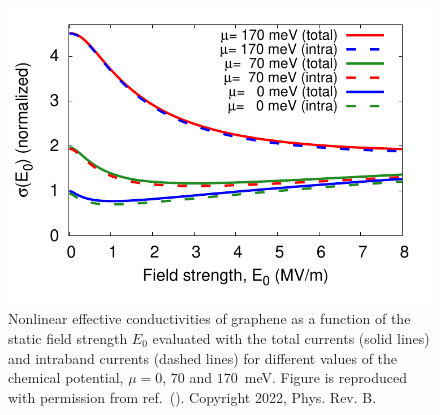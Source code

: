 \begin{figure}[htbp]
	\centering
	\includegraphics[width=0.8 \linewidth]{pic/sigma_vs_E0.pdf}
	\caption{\label{fig:conductivity}
		Nonlinear effective conductivities of graphene as a function of the static field strength $E_0$ evaluated with the total currents (solid lines) and intraband currents (dashed lines) for different values of the chemical potential, $\mu = 0$, $70$ and $170$~meV. Figure is reproduced with permission from ref.~(\cite{PhysRevB.106.024313}). Copyright 2022, Phys. Rev. B.}
\end{figure}

